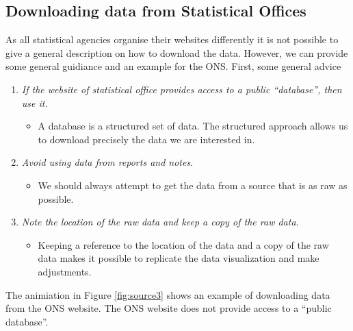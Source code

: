 \documentclass[]{book}
\providecommand{\tightlist}{%
  \setlength{\itemsep}{0pt}\setlength{\parskip}{0pt}}
\begin{document}
\hypertarget{downloading-data-from-statistical-offices}{%
\subsection{Downloading data from Statistical Offices}\label{downloading-data-from-statistical-offices}}

As all statistical agencies organise their websites differently it is not possible to give a general description on how to download the data. However, we can provide some general guidiance and an example for the ONS. First, some general advice

\begin{enumerate}
\def\labelenumi{\arabic{enumi}.}
\tightlist
\item
  \emph{If the website of statistical office provides access to a public ``database'', then use it.}

  \begin{itemize}
  \tightlist
  \item
    A database is a structured set of data. The structured approach allows us to download precisely the data we are interested in.
  \end{itemize}
\item
  \emph{Avoid using data from reports and notes}.

  \begin{itemize}
  \tightlist
  \item
    We should always attempt to get the data from a source that is as raw as possible.
  \end{itemize}
\item
  \emph{Note the location of the raw data and keep a copy of the raw data}.

  \begin{itemize}
  \tightlist
  \item
    Keeping a reference to the location of the data and a copy of the raw data makes it possible to replicate the data visualization and make adjustments.
  \end{itemize}
\end{enumerate}

The animiation in Figure \ref{fig:source3} shows an example of downloading data from the ONS website. The ONS website does not provide access to a ``public database''.
\end{document}
